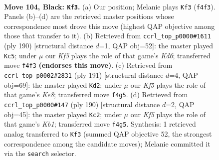 \documentclass[11pt]{article}
\begin{document}
\clearpage

\begin{figure}[p]\centering
\begin{subfigure}{0.46\textwidth}\centering
\resizebox{\linewidth}{!}{%
\newchessgame
\chessboard[
  setfen={8/8/8/8/1R3k2/7K/5p2/3r4 b - - 23 104},
  showmover=false,
  pgfstyle=straightmove, color=movearrow, markmove={f4-f3}
]}
\caption{}
\end{subfigure}\hfill
\begin{subfigure}{0.46\textwidth}\centering
\resizebox{\linewidth}{!}{%
\newchessgame
\chessboard[
  setfen={3k4/7R/3K2r1/8/3P4/8/8/8 w - - 19 96},
  showmover=false,
  pgfstyle=straightmove, color=movearrow, markmove={d6-c5}
]}
\caption{}
\end{subfigure}
\\[4pt]
\begin{subfigure}{0.46\textwidth}\centering
\resizebox{\linewidth}{!}{%
\newchessgame
\chessboard[
  setfen={8/7r/8/8/4p3/4P3/6K1/R3k3 b - - 13 96},
  showmover=false,
  pgfstyle=straightmove, color=movearrow, markmove={e1-d2}
]}
\caption{}
\end{subfigure}\hfill
\begin{subfigure}{0.46\textwidth}\centering
\resizebox{\linewidth}{!}{%
\newchessgame
\chessboard[
  setfen={1k6/8/8/8/8/2R5/8/1K5r w - - 22 96},
  showmover=false,
  pgfstyle=straightmove, color=movearrow, markmove={b1-c2}
]}
\caption{}
\end{subfigure}
\caption{\textbf{Move 104, Black: \texttt{Kf3}.} (a) Our position; Melanie plays \texttt{Kf3} (\texttt{f4f3}). Panels (b)--(d) are the retrieved master positions whose correspondence most drove this move (highest QAP objective among those that transfer to it). (b) Retrieved from \texttt{ccrl\_top\_p0000\#1611} (ply 190) [structural distance $d$=1, QAP obj=52]: the master played \texttt{Kc5}; under $\mu$ our \emph{Kf5} plays the role of that game's \emph{Kd6}; transferred move \texttt{f4f3} \textbf{(endorses this move)}. (c) Retrieved from \texttt{ccrl\_top\_p0002\#2831} (ply 191) [structural distance $d$=4, QAP obj=69]: the master played \texttt{Kd2}; under $\mu$ our \emph{Kf5} plays the role of that game's \emph{Ke8}; transferred move \texttt{f4g5}. (d) Retrieved from \texttt{ccrl\_top\_p0000\#147} (ply 190) [structural distance $d$=2, QAP obj=45]: the master played \texttt{Kc2}; under $\mu$ our \emph{Kf5} plays the role of that game's \emph{Kb1}; transferred move \texttt{f4g5}. Synthesis: 1 retrieved analog transferred to \texttt{Kf3} (summed QAP objective 52, the strongest correspondence among the candidate moves); Melanie committed it via the \texttt{search} selector.}
\label{fig:thought-m207}
\end{figure}
\end{document}
